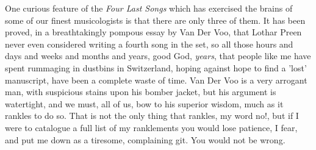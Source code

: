 One curious feature of the \emph{Four Last Songs} which has exercised the brains of some of our finest musicologists is that there are only three of them. It has been proved, in a breathtakingly pompous essay by Van Der Voo, that Lothar Preen never even considered writing a fourth song in the set, so all those hours and days and weeks and months and years, good God, \emph{years}, that people like me have spent rummaging in dustbins in Switzerland, hoping against hope to find a 'lost' manuscript, have been a complete waste of time. Van Der Voo is a very arrogant man, with suspicious stains upon his bomber jacket, but his argument is watertight, and we must, all of us, bow to his superior wisdom, much as it rankles to do so. That is not the only thing that rankles, my word no!, but if I were to catalogue a full list of my ranklements you would lose patience, I fear, and put me down as a tiresome, complaining git. You would not be wrong.


